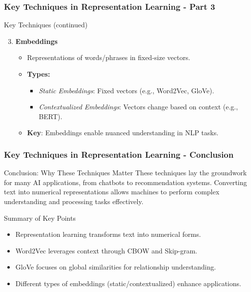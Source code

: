 \documentclass[aspectratio=169]{beamer}
\begin{document}
\begin{frame}[fragile]
    \frametitle{Key Techniques in Representation Learning - Part 3}
    \begin{block}{Key Techniques (continued)}
        \begin{enumerate}
            \setcounter{enumi}{2} %
            \item \textbf{Embeddings}
                \begin{itemize}
                    \item Representations of words/phrases in fixed-size vectors.
                    \item \textbf{Types:}
                        \begin{itemize}
                            \item \textit{Static Embeddings}: Fixed vectors (e.g., Word2Vec, GloVe).
                            \item \textit{Contextualized Embeddings}: Vectors change based on context (e.g., BERT).
                        \end{itemize}
                    \item \textbf{Key}: Embeddings enable nuanced understanding in NLP tasks.
                \end{itemize}
        \end{enumerate}
    \end{block}
\end{frame}

\begin{frame}[fragile]
    \frametitle{Key Techniques in Representation Learning - Conclusion}
    \begin{block}{Conclusion: Why These Techniques Matter}
        These techniques lay the groundwork for many AI applications, from chatbots to recommendation systems. Converting text into numerical representations allows machines to perform complex understanding and processing tasks effectively.
    \end{block}
    \begin{block}{Summary of Key Points}
        \begin{itemize}
            \item Representation learning transforms text into numerical forms.
            \item Word2Vec leverages context through CBOW and Skip-gram.
            \item GloVe focuses on global similarities for relationship understanding.
            \item Different types of embeddings (static/contextualized) enhance applications.
        \end{itemize}
    \end{block}
\end{frame}
\end{document}
